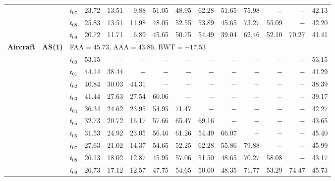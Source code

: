 \begin{table}[ht]
\begin{tabular}{@{}l l l *{11}{r}@{}}
 & & $t_{07}$ & 23.72 & 13.51 & 9.88 & 51.05 & 48.95 & 62.28 & 51.65 & 75.98 & $-$ & $-$ & 42.13 \\
 & & $t_{08}$ & 25.83 & 13.51 & 11.98 & 48.05 & 52.55 & 53.89 & 45.65 & 73.27 & 55.09 & $-$ & 42.20 \\
 & & $t_{09}$ & 20.72 & 11.71 & 6.89 & 45.65 & 50.75 & 54.49 & 39.04 & 62.46 & 52.10 & 70.27 & 41.41 \\
\midrule
\multirow{11}{*}{\textbf{Aircraft}} & \multirow{11}{*}{\textbf{AS(1)}} & \multicolumn{12}{l}{\quad\small FAA$=45.73$,\; AAA$=43.86$,\; BWT$=-17.53$} \\
 & & $t_{00}$ & 53.15 & $-$ & $-$ & $-$ & $-$ & $-$ & $-$ & $-$ & $-$ & $-$ & 53.15 \\
 & & $t_{01}$ & 44.14 & 38.44 & $-$ & $-$ & $-$ & $-$ & $-$ & $-$ & $-$ & $-$ & 41.29 \\
 & & $t_{02}$ & 40.84 & 30.03 & 44.31 & $-$ & $-$ & $-$ & $-$ & $-$ & $-$ & $-$ & 38.39 \\
 & & $t_{03}$ & 41.44 & 27.63 & 27.54 & 60.06 & $-$ & $-$ & $-$ & $-$ & $-$ & $-$ & 39.17 \\
 & & $t_{04}$ & 36.34 & 24.62 & 23.95 & 54.95 & 71.47 & $-$ & $-$ & $-$ & $-$ & $-$ & 42.27 \\
 & & $t_{05}$ & 32.73 & 20.72 & 16.17 & 57.66 & 65.47 & 69.16 & $-$ & $-$ & $-$ & $-$ & 43.65 \\
 & & $t_{06}$ & 31.53 & 24.92 & 23.05 & 56.46 & 61.26 & 54.49 & 66.07 & $-$ & $-$ & $-$ & 45.40 \\
 & & $t_{07}$ & 27.63 & 21.02 & 14.37 & 54.65 & 52.25 & 62.28 & 55.86 & 79.88 & $-$ & $-$ & 45.99 \\
 & & $t_{08}$ & 26.13 & 18.02 & 12.87 & 45.95 & 57.06 & 51.50 & 48.65 & 70.27 & 58.08 & $-$ & 43.17 \\
 & & $t_{09}$ & 26.73 & 17.12 & 12.57 & 47.75 & 54.65 & 50.60 & 48.35 & 71.77 & 53.29 & 74.47 & 45.73 \\
\bottomrule
\end{tabular}
\end{table}

